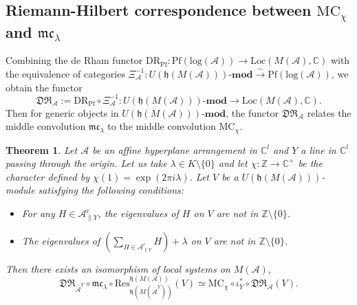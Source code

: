 \documentclass[a4paper,12pt]{article}
\newcommand{\C}{\mathbb{C}}
\newtheorem{thm}{Theorem}[section]
\theoremstyle{definition}
\theoremstyle{remark}
\begin{document}
\subsection{Riemann-Hilbert correspondence between $\mathrm{MC}_{\chi}$ and $\mathfrak{mc}_{\lambda}$}
Combining the de Rham functor $\mathrm{DR}_{\mathrm{Pf}}\colon \mathrm{Pf}(\mathrm{log}(\mathcal{A})) \to \mathrm{Loc}(M(\mathcal{A}),\mathbb{C})$ 
with the equivalence of categories $\Xi_{\mathcal{A}}^{-1}\colon U(\mathfrak{h}(M(\mathcal{A})))\text{-}\mathbf{mod}\xrightarrow{\sim} \mathrm{Pf}(\mathrm{log}(\mathcal{A}))$,
we obtain the functor
\[
	\mathfrak{DR}_{\mathcal{A}} := \mathrm{DR}_{\mathrm{Pf}} \circ \Xi_{\mathcal{A}}^{-1}\colon U(\mathfrak{h}(M(\mathcal{A})))\text{-}\mathbf{mod} \longrightarrow \mathrm{Loc}(M(\mathcal{A}),\mathbb{C}).
\]
Then for generic objects in $U(\mathfrak{h}(M(\mathcal{A})))\text{-}\mathbf{mod}$, the functor $\mathfrak{DR}_{\mathcal{A}}$ relates 
the middle convolution $\mathfrak{mc}_{\lambda}$ to the middle convolution $\mathrm{MC}_{\chi}$.
\begin{thm}\label{thm:RHmc}
	Let $\mathcal{A}$ be an affine hyperplane arrangement in $\C^{l}$ and $Y$ a line in $\C^{l}$ passing through the origin.
	Let us take $\lambda\in K\setminus\{0\}$ and let $\chi\colon \mathbb{Z}\to \mathbb{C}^{\times}$ be the character defined by $\chi(1)=\exp(2\pi i\lambda)$. 
	Let $V$ be a $U(\mathfrak{h}(M(\mathcal{A})))$-module satisfying the following conditions:
	\begin{itemize}
		\item For any $H\in \mathcal{A}_{\parallel Y}^{c}$, the eigenvalues of $H$ on $V$ are not in $\mathbb{Z}\setminus\{0\}$.
		\item The eigenvalues of $\left(\sum_{H\in \mathcal{A}_{\parallel Y}^{c}}H\right)+\lambda$ on $V$ are not in $\mathbb{Z}\setminus\{0\}$. 
	\end{itemize}
Then there exists an isomorphism of local systems on $M(\mathcal{A})$,
\[
	\mathfrak{DR}_{\overline{\mathcal{A}}^{Y}}\circ \mathfrak{mc}_{\lambda}\circ \mathrm{Res}_{\mathfrak{h}(M(\overline{\mathcal{A}}^{Y}))}^{\mathfrak{h}(M(\mathcal{A}))}(V)\simeq \mathrm{MC}_{\chi}\circ \iota_{Y}^{*}\circ\mathfrak{DR}_{\mathcal{A}}(V).
\]
\end{thm}
\end{document}
